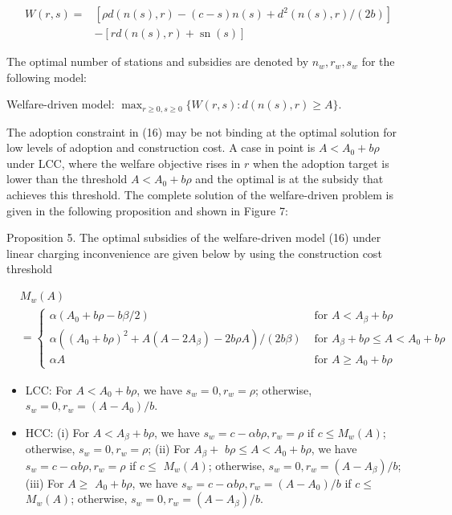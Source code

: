 \documentclass[10pt]{article}
\begin{document}
\begin{align*}
W(r, s)= & {\left[\rho d(n(s), r)-(c-s) n(s)+d^{2}(n(s), r) /(2 b)\right] } \\
& -[r d(n(s), r)+\operatorname{sn}(s)] \tag{15}
\end{align*}


The optimal number of stations and subsidies are denoted by $n_{w}, r_{w}, s_{w}$ for the following model:

Welfare-driven model: $\max _{r \geq 0, s \geq 0}\{W(r, s): d(n(s), r) \geq A\}$.

The adoption constraint in (16) may be not binding at the optimal solution for low levels of adoption and construction cost. A case in point is $A<A_{0}+b \rho$ under LCC, where the welfare objective rises in $r$ when the adoption target is lower than the threshold $A<A_{0}+b \rho$ and the optimal is at the subsidy that achieves this threshold. The complete solution of the welfare-driven problem is given in the following proposition and shown in Figure 7:

Proposition 5. The optimal subsidies of the welfare-driven model (16) under linear charging inconvenience are given below by using the construction cost threshold


\begin{align*}
& M_{w}(A) \\
& = \begin{cases}\alpha\left(A_{0}+b \rho-b \beta / 2\right) & \text { for } A<A_{\beta}+b \rho \\
\alpha\left(\left(A_{0}+b \rho\right)^{2}+A\left(A-2 A_{\beta}\right)-2 b \rho A\right) /(2 b \beta) & \text { for } A_{\beta}+b \rho \leq A<A_{0}+b \rho \\
\alpha A & \text { for } A \geq A_{0}+b \rho\end{cases} \tag{17}
\end{align*}


\begin{itemize}
  \item LCC: For $A<A_{0}+b \rho$, we have $s_{w}=0, r_{w}=\rho$; otherwise, $s_{w}=0, r_{w}=\left(A-A_{0}\right) / b$.
  \item HCC: (i) For $A<A_{\beta}+b \rho$, we have $s_{w}=c-\alpha b \rho, r_{w}=\rho$ if $c \leq M_{w}(A)$; otherwise, $s_{w}=0, r_{w}=\rho$; (ii) For $A_{\beta}+$ $b \rho \leq A<A_{0}+b \rho$, we have $s_{w}=c-\alpha b \rho, r_{w}=\rho$ if $c \leq$ $M_{w}(A)$; otherwise, $s_{w}=0, r_{w}=\left(A-A_{\beta}\right) / b$; (iii) For $A \geq$ $A_{0}+b \rho$, we have $s_{w}=c-\alpha b \rho, r_{w}=\left(A-A_{0}\right) / b$ if $c \leq$ $M_{w}(A)$; otherwise, $s_{w}=0, r_{w}=\left(A-A_{\beta}\right) / b$.
\end{itemize}
\end{document}

